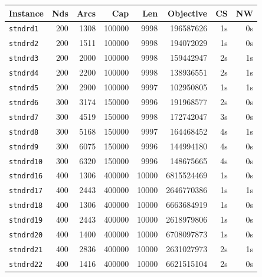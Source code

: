 \documentclass[a4paper,11pt,twoside]{book}
\begin{document}
\begin{multicols}{2}
\vfill
\begin{center}
\small
\begin{tabular}{|lrrrrrrr|}
\hline
{\bf Instance} & {\bf Nds} & {\bf Arcs} & {\bf Cap} & {\bf Len} & {\bf Objective} & {\bf CS} & {\bf NW} \\
\hline
\hline
\verb/stndrd1/ &     200 &    1308 &   100000 &     9998 &      196587626 &        1s &    0s \\
\verb/stndrd2/ &     200 &    1511 &   100000 &     9998 &      194072029 &        1s &    0s \\
\verb/stndrd3/ &     200 &    2000 &   100000 &     9998 &      159442947 &        2s &    1s \\
\verb/stndrd4/ &     200 &    2200 &   100000 &     9998 &      138936551 &        2s &    1s \\
\verb/stndrd5/ &     200 &    2900 &   100000 &     9997 &      102950805 &        1s &    1s \\
\verb/stndrd6/ &     300 &    3174 &   150000 &     9996 &      191968577 &        2s &    0s \\
\verb/stndrd7/ &     300 &    4519 &   150000 &     9998 &      172742047 &        3s &    0s \\
\verb/stndrd8/ &     300 &    5168 &   150000 &     9997 &      164468452 &        4s &    1s \\
\verb/stndrd9/ &     300 &    6075 &   150000 &     9996 &      144994180 &        4s &    0s \\
\verb/stndrd10/&     300 &    6320 &   150000 &     9996 &      148675665 &        4s &    0s \\
\verb/stndrd16/&     400 &    1306 &   400000 &    10000 &     6815524469 &        1s &    0s \\
\verb/stndrd17/&     400 &    2443 &   400000 &    10000 &     2646770386 &        1s &    1s \\
\verb/stndrd18/&     400 &    1306 &   400000 &    10000 &     6663684919 &        1s &    0s \\
\verb/stndrd19/&     400 &    2443 &   400000 &    10000 &     2618979806 &        1s &    0s \\
\verb/stndrd20/&     400 &    1400 &   400000 &    10000 &     6708097873 &        1s &    0s \\
\verb/stndrd21/&     400 &    2836 &   400000 &    10000 &     2631027973 &        2s &    1s \\
\verb/stndrd22/&     400 &    1416 &   400000 &    10000 &     6621515104 &        2s &    0s \\

\end{tabular}
\end{center}
\end{multicols}
\end{document}
